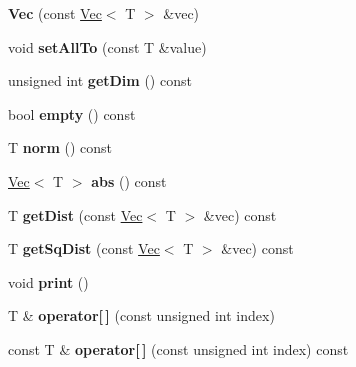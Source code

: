 \begin{DoxyCompactItemize}
\item 
\hypertarget{class_vec_a1e10adde7df64c297917d952834172c1}{{\bfseries Vec} (const \hyperlink{class_vec}{Vec}$<$ T $>$ \&vec)}\label{class_vec_a1e10adde7df64c297917d952834172c1}

\item 
\hypertarget{class_vec_a4a7eec8a1a09fa18b7c47759c9e1eb3e}{void {\bfseries set\-All\-To} (const T \&value)}\label{class_vec_a4a7eec8a1a09fa18b7c47759c9e1eb3e}

\item 
\hypertarget{class_vec_a68e6c17c80ae91a15578dda0ed00e9be}{unsigned int {\bfseries get\-Dim} () const }\label{class_vec_a68e6c17c80ae91a15578dda0ed00e9be}

\item 
\hypertarget{class_vec_a5ceca3b447f22abfcac2eb1c26d69fc6}{bool {\bfseries empty} () const }\label{class_vec_a5ceca3b447f22abfcac2eb1c26d69fc6}

\item 
\hypertarget{class_vec_a9e1ad475113041eb69801193f7af467e}{T {\bfseries norm} () const }\label{class_vec_a9e1ad475113041eb69801193f7af467e}

\item 
\hypertarget{class_vec_ab7830c19f133844008745ad7531066b7}{\hyperlink{class_vec}{Vec}$<$ T $>$ {\bfseries abs} () const }\label{class_vec_ab7830c19f133844008745ad7531066b7}

\item 
\hypertarget{class_vec_a499baac66505ebd7dd6d8bb7461fd5c5}{T {\bfseries get\-Dist} (const \hyperlink{class_vec}{Vec}$<$ T $>$ \&vec) const }\label{class_vec_a499baac66505ebd7dd6d8bb7461fd5c5}

\item 
\hypertarget{class_vec_a371f2087dff668951721cf7568f2416a}{T {\bfseries get\-Sq\-Dist} (const \hyperlink{class_vec}{Vec}$<$ T $>$ \&vec) const }\label{class_vec_a371f2087dff668951721cf7568f2416a}

\item 
\hypertarget{class_vec_a9e40a038541cb670051f7676dba7bd57}{void {\bfseries print} ()}\label{class_vec_a9e40a038541cb670051f7676dba7bd57}

\item 
\hypertarget{class_vec_a60f7ebfabcf91fddbf98a7c90b6f303a}{T \& {\bfseries operator\mbox{[}$\,$\mbox{]}} (const unsigned int index)}\label{class_vec_a60f7ebfabcf91fddbf98a7c90b6f303a}

\item 
\hypertarget{class_vec_aba24a8d264d923d9a3048ca7acb7cf26}{const T \& {\bfseries operator\mbox{[}$\,$\mbox{]}} (const unsigned int index) const }\label{class_vec_aba24a8d264d923d9a3048ca7acb7cf26}


\end{DoxyCompactItemize}
